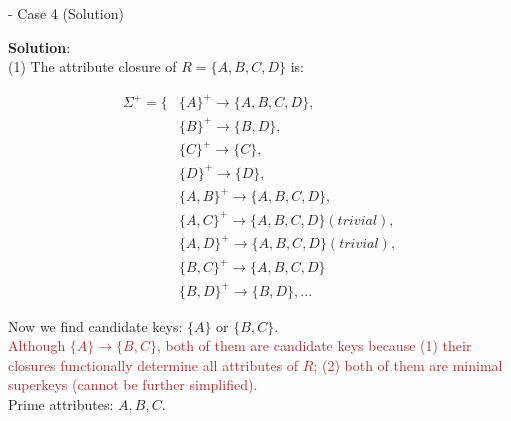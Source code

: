 \begin{frame}[fragile]{ - Case 4 (Solution)}
	
	\textbf{Solution}:\\
	(1) The attribute closure of $R = \{A, B, C, D\}$ is:\\
	\begin{scriptsize}
		\begin{align*} 
			\Sigma^{+} = \{&\{A\}^{+} \rightarrow \{A, B, C, D\},\\
			&\{B\}^{+} \rightarrow \{B, D\},\\
			&\{C\}^{+} \rightarrow \{C\},\\
			&\{D\}^{+} \rightarrow \{D\},\\
			&\{A, B\}^{+} \rightarrow \{A, B, C, D\},\\
			&\{A, C\}^{+} \rightarrow \{A, B, C, D\} (trivial),\\
			&\{A, D\}^{+} \rightarrow \{A, B, C, D\} (trivial),\\
			&\{B, C\}^{+} \rightarrow \{A, B, C, D\}\\
			&\{B, D\}^{+} \rightarrow \{B, D\}, ...
		\end{align*}
	\end{scriptsize}\vspace{-15pt}
	
	Now we find candidate keys: $\{A\}$ or $\{B, C\}$.\\
	\textcolor{brown}{Although $\{A\}\rightarrow\{B, C\}$, both of them are candidate keys because (1) their closures functionally determine all attributes of $R$; (2) both of them are minimal superkeys (cannot be further simplified).}\\
	Prime attributes: $A, B, C$.
\end{frame}

